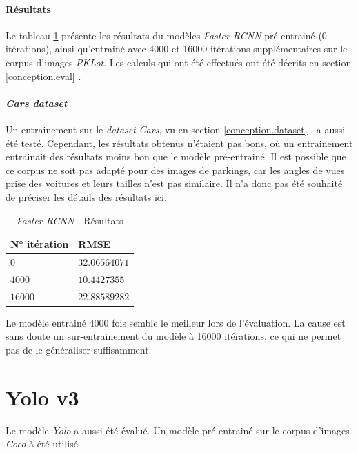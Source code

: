 \paragraph{Résultats}

Le tableau \ref{tab:rcnn_results} présente les résultats du modèles \textit{Faster RCNN} pré-entrainé (0 itérations), ainsi qu'entrainé avec 4000 et 16000 itérations supplémentaires sur le corpus d'images \textit{PKLot}. Les calculs qui ont été effectués ont été décrits en section \ref{conception.eval} .

\paragraph{\textit{Cars dataset}}

Un entrainement sur le \textit{dataset} \textit{Cars}, vu en section \ref{conception.dataset} , a aussi été testé. Cependant, les résultats obtenus n'étaient pas bons, où un entrainement entrainait des résultats moins bon que le modèle pré-entrainé. Il est possible que ce corpus ne soit pas adapté pour des images de parkings, car les angles de vues prise des voitures et leurs tailles n'est pas similaire. Il n'a donc pas été souhaité de préciser les détails des résultats ici.

\begin{table}[ht]
\centering
\begin{tabular}{@{}ll@{}}
\toprule
N° itération & RMSE \\ \midrule
$0$            & $32.06564071$ \\
$4000$         & $10.4427355$ \\
$16000$        & $22.88589282$ \\ \bottomrule
\end{tabular}
\caption{\textit{Faster RCNN} - Résultats}
\label{tab:rcnn_results}
\end{table}

Le modèle entrainé 4000 fois semble le meilleur lors de l'évaluation. La cause est sans doute un sur-entrainement du modèle à 16000 itérations, ce qui ne permet pas de le généraliser suffisamment.

\section{Yolo v3}

Le modèle \textit{Yolo} a aussi été évalué. Un modèle pré-entrainé sur le corpus d'images \textit{Coco}\autocite{data:coco} à été utilisé.

